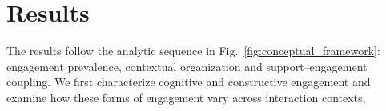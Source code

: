 \section{Results}\label{sec:results}






The results follow the analytic sequence in Fig.~\ref{fig:conceptual_framework}: engagement prevalence, contextual organization and support--engagement coupling. We first characterize cognitive and constructive engagement and examine how these forms of engagement vary across interaction contexts, 






